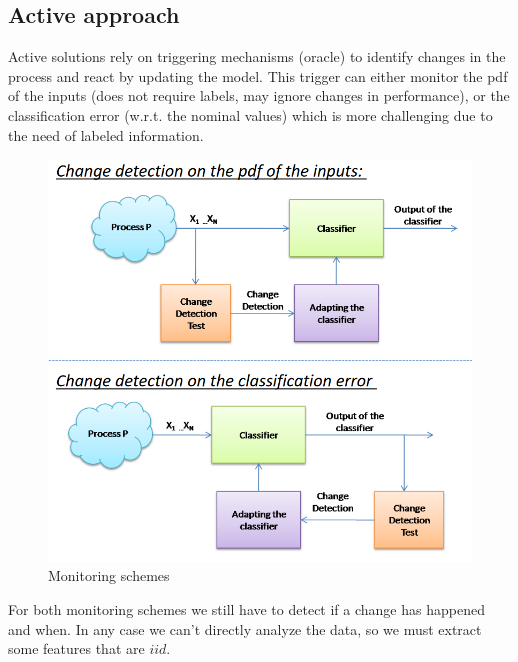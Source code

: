 \documentclass{article}
\begin{document}
    \subsection{Active approach}
      Active solutions rely on triggering mechanisms (oracle) to identify changes in the process and react by updating the model. This trigger can either monitor the pdf of the inputs (does not require labels, may ignore changes in performance), or the classification error (w.r.t. the nominal values) which is more challenging due to the need of labeled information.
      \begin{figure}[H]
        \includegraphics[scale=0.35]{../Images/ActivePDFAcc.png}
        \centering
        \caption{Monitoring schemes}
      \end{figure}
      For both monitoring schemes we still have to detect if a change has happened and when. In any case we can't directly analyze the data, so we must extract some features that are $iid$.
\end{document}
